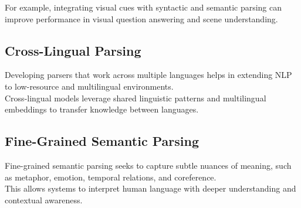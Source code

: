 \documentclass[10pt]{article}
\begin{document}
For example, integrating visual cues with syntactic and semantic parsing can improve performance in visual question answering and scene understanding.

\subsection*{Cross-Lingual Parsing}
Developing parsers that work across multiple languages helps in extending NLP to low-resource and multilingual environments.\\
Cross-lingual models leverage shared linguistic patterns and multilingual embeddings to transfer knowledge between languages.

\subsection*{Fine-Grained Semantic Parsing}
Fine-grained semantic parsing seeks to capture subtle nuances of meaning, such as metaphor, emotion, temporal relations, and coreference.\\
This allows systems to interpret human language with deeper understanding and contextual awareness.
\end{document}
